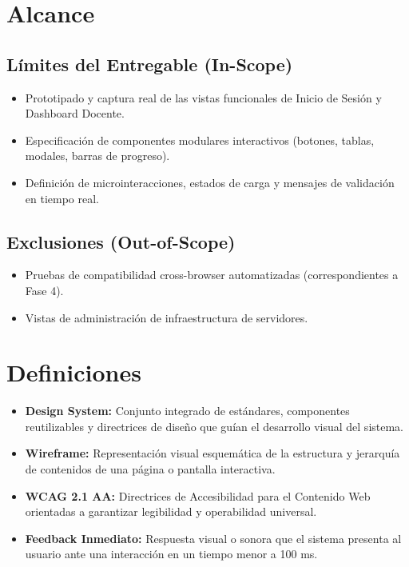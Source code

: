 \documentclass[12pt,a4paper]{article}
\begin{document}
\section{Alcance}
\subsection{Límites del Entregable (In-Scope)}
\begin{itemize}[leftmargin=1.5em, itemsep=2pt]
    \item Prototipado y captura real de las vistas funcionales de Inicio de Sesión y Dashboard Docente.
    \item Especificación de componentes modulares interactivos (botones, tablas, modales, barras de progreso).
    \item Definición de microinteracciones, estados de carga y mensajes de validación en tiempo real.
\end{itemize}
\subsection{Exclusiones (Out-of-Scope)}
\begin{itemize}[leftmargin=1.5em, itemsep=2pt]
    \item Pruebas de compatibilidad cross-browser automatizadas (correspondientes a Fase 4).
    \item Vistas de administración de infraestructura de servidores.
\end{itemize}

\section{Definiciones}
\begin{itemize}[leftmargin=1.5em, itemsep=2pt]
    \item \textbf{Design System:} Conjunto integrado de estándares, componentes reutilizables y directrices de diseño que guían el desarrollo visual del sistema.
    \item \textbf{Wireframe:} Representación visual esquemática de la estructura y jerarquía de contenidos de una página o pantalla interactiva.
    \item \textbf{WCAG 2.1 AA:} Directrices de Accesibilidad para el Contenido Web orientadas a garantizar legibilidad y operabilidad universal.
    \item \textbf{Feedback Inmediato:} Respuesta visual o sonora que el sistema presenta al usuario ante una interacción en un tiempo menor a 100 ms.
\end{itemize}
\end{document}
